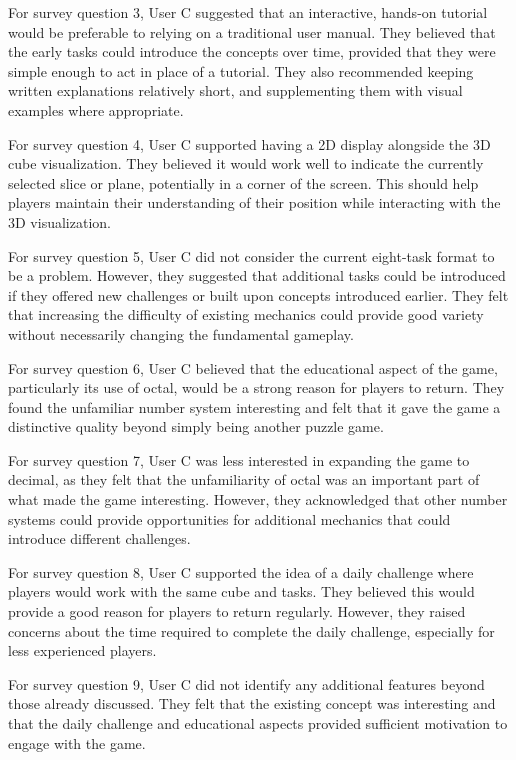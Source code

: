 \documentclass{article}
\begin{document}
For survey question 3, User C suggested that an interactive, hands-on tutorial
would be preferable to relying on a traditional user manual. They believed
that the early tasks could introduce the concepts over time, provided that
they were simple enough to act in place of a tutorial. They also recommended keeping
written explanations relatively short, and supplementing them with visual examples where appropriate.

For survey question 4, User C supported having a 2D display alongside the
3D cube visualization. They believed it would work well to indicate the currently selected slice or
plane, potentially in a corner of the screen. This should help players maintain their understanding 
of their position while interacting with the 3D visualization.

For survey question 5, User C did not consider the current eight-task format
to be a problem. However, they suggested that additional tasks could be
introduced if they offered new challenges or built upon concepts introduced
earlier. They felt that increasing the difficulty of existing
mechanics could provide good variety without necessarily changing the
fundamental gameplay.

For survey question 6, User C believed that the educational aspect of the game,
particularly its use of octal, would be a strong reason for players to return.
They found the unfamiliar number system interesting and felt that it gave the
game a distinctive quality beyond simply being another puzzle game.

For survey question 7, User C was less interested in expanding the game to
decimal, as they felt that the unfamiliarity of octal was an important part 
of what made the game interesting. However, they acknowledged that other number 
systems could provide opportunities for additional mechanics that could introduce
different challenges.

For survey question 8, User C supported the idea of a daily challenge where
players would work with the same cube and tasks. They believed this would
provide a good reason for players to return regularly. However, they raised
concerns about the time required to complete the daily challenge, 
especially for less experienced players.

For survey question 9, User C did not identify any additional features beyond
those already discussed. They felt that the existing concept was interesting
and that the daily challenge and educational aspects provided sufficient
motivation to engage with the game.
\end{document}
